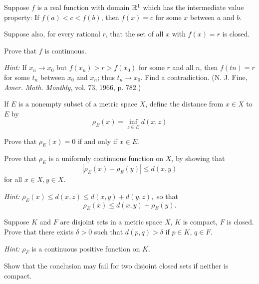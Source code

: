\begin{myExercise}
    \label{ex:4.19}
    Suppose $f$ is a real function with domain ${\protect\mathbb R}^1$ which has the intermediate value property: 
    If $f(a)< c <f(b)$, then $f(x) = c$ for some $x$ between $a$ and $b$.
    
    Suppose also, for every rational $r$, that the set of all $x$ with $f(x) = r$ is closed. 
    
    Prove that $f$ is continuous.
    
    \emph{Hint:} If $x_n \rightarrow x_0$ but $f(x_n) > r > f(x_0)$ for some $r$ and all $n$, 
    then $f(tn) = r$ for some $t_n$ between $x_0$ and $x_n$; 
    thus $t_n \rightarrow x_0$. 
    Find a contradiction. 
    (N. J. Fine, \emph{Amer. Math. Monthly}, vol. 73, 1966, p. 782.)
\end{myExercise}


\begin{myExercise}
    \label{ex:4.20}
    If $E$ is a nonempty subset of a metric space $X$, 
    define the distance from $x \in X$ to $E$ by
    \begin{equation*}
        \rho_{E}(x)  = \inf_{z \in E} d(x,z)
    \end{equation*}
    \begin{asparaenum}[(a)]
    \item Prove that $\rho_E(x) = 0$ if and only if $x \in E$.
    \item Prove that $\rho_E$ is a uniformly continuous function on $X$, by showing that
    \begin{equation*}
        \left| \rho_E(x) - \rho_E(y) \right| \leq d(x, y)
    \end{equation*}
    for all $x \in X, y \in X$.
    \end{asparaenum}
    \emph{Hint:} $\rho_E(x) \leq d(x, z) \leq d(x, y) + d(y, z),$ 
    so that
    \begin{equation*}
        \rho_E(x) \leq d(x, y) + \rho_E(y).
    \end{equation*}
\end{myExercise}


\begin{myExercise}
    \label{ex:4.21}
    Suppose $K$ and $F$ are disjoint sets in a metric space $X$, $K$ is compact, $F$ is closed. 
    Prove that there exists $\delta > 0$ 
    such that $d(p, q) > \delta$ if $p \in K$, $q \in F$. 
    
    \emph{Hint:} $\rho_F$ is a continuous positive function on $K$.

    Show that the conclusion may fail for two disjoint closed sets if neither is compact.
\end{myExercise}


